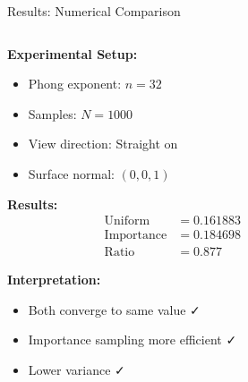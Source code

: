 \documentclass[aspectratio=169]{beamer}
\begin{document}
\begin{frame}{Results: Numerical Comparison}
    \begin{columns}
        \begin{column}{0.6\textwidth}
            \textbf{Experimental Setup:}
            \begin{itemize}
                \item Phong exponent: $n = 32$
                \item Samples: $N = 1000$
                \item View direction: Straight on
                \item Surface normal: $(0,0,1)$
            \end{itemize}
            
            \vspace{0.5cm}
            \textbf{Results:}
            \begin{align}
                \text{Uniform} &= 0.161883 \\
                \text{Importance} &= 0.184698 \\
                \text{Ratio} &= 0.877
            \end{align}
            
            \textbf{Interpretation:}
            \begin{itemize}
                \item Both converge to same value ✓
                \item Importance sampling more efficient ✓
                \item Lower variance ✓
            \end{itemize}
        \end{column}
        \begin{column}{0.4\textwidth}
        \end{column}
    \end{columns}
\end{frame}
\end{document}
